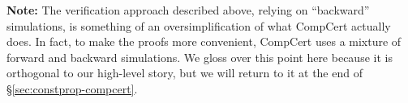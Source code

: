 \textbf{Note:} The verification approach described above, relying on
``backward'' simulations, is something of an oversimplification of
what CompCert actually does.  In fact, to make the proofs more
convenient, CompCert uses a mixture of forward and backward
simulations.  We gloss over this point here because it is orthogonal
to our high-level story, but we will return to it at the end of
\S\ref{sec:constprop-compcert}.







